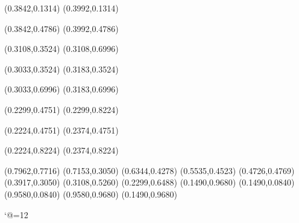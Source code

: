 \PST@Solid(0.3842,0.1314)
(0.3992,0.1314)

\PST@Solid(0.3842,0.4786)
(0.3992,0.4786)

\PST@Solid(0.3108,0.3524)
(0.3108,0.6996)

\PST@Solid(0.3033,0.3524)
(0.3183,0.3524)

\PST@Solid(0.3033,0.6996)
(0.3183,0.6996)

\PST@Solid(0.2299,0.4751)
(0.2299,0.8224)

\PST@Solid(0.2224,0.4751)
(0.2374,0.4751)

\PST@Solid(0.2224,0.8224)
(0.2374,0.8224)

\PST@Diamond(0.7962,0.7716)
\PST@Diamond(0.7153,0.3050)
\PST@Diamond(0.6344,0.4278)
\PST@Diamond(0.5535,0.4523)
\PST@Diamond(0.4726,0.4769)
\PST@Diamond(0.3917,0.3050)
\PST@Diamond(0.3108,0.5260)
\PST@Diamond(0.2299,0.6488)
\PST@Border(0.1490,0.9680)
(0.1490,0.0840)
(0.9580,0.0840)
(0.9580,0.9680)
(0.1490,0.9680)

\catcode`@=12
\fi
\endpspicture
